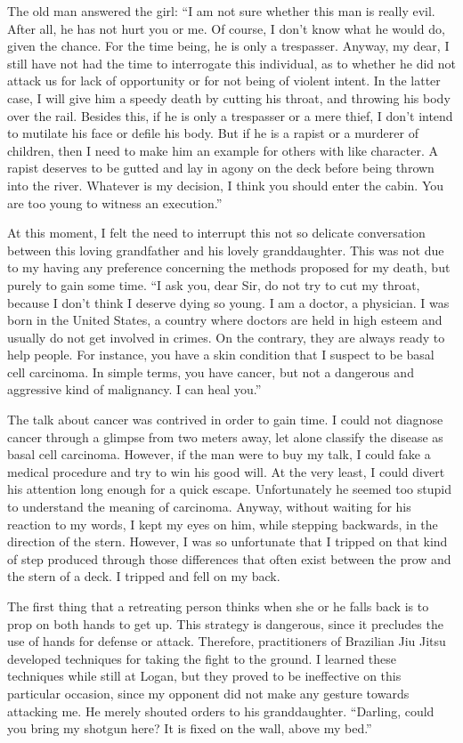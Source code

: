 \documentclass[
  12pt,
]{book}
\begin{document}
The old man answered the girl: ``I am not sure whether this man is
really evil. After all, he has not hurt you or me. Of course, I don't
know what he would do, given the chance. For the time being, he is only
a trespasser. Anyway, my dear, I still have not had the time to
interrogate this individual, as to whether he did not attack us for lack
of opportunity or for not being of violent intent. In the latter case, I
will give him a speedy death by cutting his throat, and throwing his
body over the rail. Besides this, if he is only a trespasser or a mere
thief, I don't intend to mutilate his face or defile his body. But if he
is a rapist or a murderer of children, then I need to make him an
example for others with like character. A rapist deserves to be gutted
and lay in agony on the deck before being thrown into the river.
Whatever is my decision, I think you should enter the cabin. You are too
young to witness an execution.''

At this moment, I felt the need to interrupt this not so delicate
conversation between this loving grandfather and his lovely
granddaughter. This was not due to my having any preference concerning
the methods proposed for my death, but purely to gain some time. ``I ask
you, dear Sir, do not try to cut my throat, because I don't think I
deserve dying so young. I am a doctor, a physician. I was born in the
United States, a country where doctors are held in high esteem and
usually do not get involved in crimes. On the contrary, they are always
ready to help people. For instance, you have a skin condition that I
suspect to be basal cell carcinoma. In simple terms, you have cancer,
but not a dangerous and aggressive kind of malignancy. I can heal you.''

The talk about cancer was contrived in order to gain time. I could not
diagnose cancer through a glimpse from two meters away, let alone
classify the disease as basal cell carcinoma. However, if the man were
to buy my talk, I could fake a medical procedure and try to win his good
will. At the very least, I could divert his attention long enough for a
quick escape. Unfortunately he seemed too stupid to understand the
meaning of carcinoma. Anyway, without waiting for his reaction to my
words, I kept my eyes on him, while stepping backwards, in the direction
of the stern. However, I was so unfortunate that I tripped on that kind
of step produced through those differences that often exist between the
prow and the stern of a deck. I tripped and fell on my back.

The first thing that a retreating person thinks when she or he falls
back is to prop on both hands to get up. This strategy is dangerous,
since it precludes the use of hands for defense or attack. Therefore,
practitioners of Brazilian Jiu Jitsu developed techniques for taking the
fight to the ground. I learned these techniques while still at Logan,
but they proved to be ineffective on this particular occasion, since my
opponent did not make any gesture towards attacking me. He merely
shouted orders to his granddaughter. ``Darling, could you bring my
shotgun here? It is fixed on the wall, above my bed.''
\end{document}

